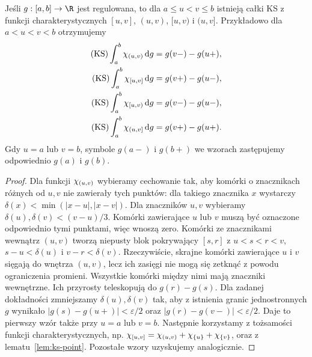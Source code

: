 \begin{lemat}
\label{lem:ks-indicators}
Jeśli $g:[a,b]\to\R$ jest regulowana, to dla $a\le u<v\le b$ istnieją całki KS z funkcji charakterystycznych $[u,v]$, $(u,v)$, $[u,v)$ i $(u,v]$. Przykładowo dla $a<u<v<b$ otrzymujemy
\[
 \begin{aligned}
 (\mathrm{KS})\int_a^b\chi_{(u,v)}\,\mathrm dg&=g(v-)-g(u+),\\
 (\mathrm{KS})\int_a^b\chi_{[u,v]}\,\mathrm dg&=g(v+)-g(u-),\\
 (\mathrm{KS})\int_a^b\chi_{[u,v)}\,\mathrm dg&=g(v-)-g(u-),\\
 (\mathrm{KS})\int_a^b\chi_{(u,v]}\,\mathrm dg&=g(v+)-g(u+).
 \end{aligned}
\]
Gdy $u=a$ lub $v=b$, symbole $g(a-)$ i $g(b+)$ we wzorach zastępujemy odpowiednio $g(a)$ i $g(b)$.
\end{lemat}
\begin{proof}
Dla funkcji $\chi_{(u,v)}$ wybieramy cechowanie tak, aby komórki o znacznikach różnych od $u,v$ nie zawierały tych punktów: dla takiego znacznika $x$ wystarczy $\delta(x)<\min(|x-u|,|x-v|)$. Dla znaczników $u,v$ wybieramy $\delta(u),\delta(v)<(v-u)/3$. Komórki zawierające $u$ lub $v$ muszą być oznaczone odpowiednio tymi punktami, więc wnoszą zero. Komórki ze znacznikami wewnątrz $(u,v)$ tworzą niepusty blok pokrywający $[s,r]$ z $u<s<r<v$, $s-u<\delta(u)$ i $v-r<\delta(v)$. Rzeczywiście, skrajne komórki zawierające $u$ i $v$ sięgają do wnętrza $(u,v)$, lecz ich zasięgi nie mogą się zetknąć z powodu ograniczenia promieni. Wszystkie komórki między nimi mają znaczniki wewnętrzne. Ich przyrosty teleskopują do $g(r)-g(s)$. Dla zadanej dokładności zmniejszamy $\delta(u),\delta(v)$ tak, aby z istnienia granic jednostronnych $g$ wynikało $|g(s)-g(u+)|<\varepsilon/2$ oraz $|g(r)-g(v-)|<\varepsilon/2$. Daje to pierwszy wzór także przy $u=a$ lub $v=b$. Następnie korzystamy z tożsamości funkcji charakterystycznych, np. $\chi_{[u,v]}=\chi_{(u,v)}+\chi_{\{u\}}+\chi_{\{v\}}$, oraz z lematu~\ref{lem:ks-point}. Pozostałe wzory uzyskujemy analogicznie.
\end{proof}

